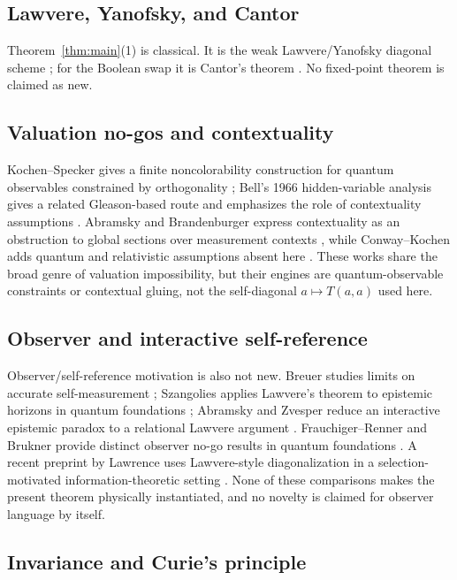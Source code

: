 \documentclass[11pt]{article}
\theoremstyle{definition}
\theoremstyle{remark}
\begin{document}
\subsection{Lawvere, Yanofsky, and Cantor}

Theorem~\ref{thm:main}(1) is classical. It is the weak Lawvere/Yanofsky diagonal scheme \cite{lawvere1969,yanofsky2003}; for the Boolean swap it is Cantor's theorem \cite{cantor1891}. No fixed-point theorem is claimed as new.

\subsection{Valuation no-gos and contextuality}

Kochen--Specker gives a finite noncolorability construction for quantum observables constrained by orthogonality \cite{kochenspecker1967}; Bell's 1966 hidden-variable analysis gives a related Gleason-based route and emphasizes the role of contextuality assumptions \cite{bell1966}. Abramsky and Brandenburger express contextuality as an obstruction to global sections over measurement contexts \cite{abramskybrandenburger2011}, while Conway--Kochen adds quantum and relativistic assumptions absent here \cite{conwaykochen2006}. These works share the broad genre of valuation impossibility, but their engines are quantum-observable constraints or contextual gluing, not the self-diagonal $a\mapsto T(a,a)$ used here.

\subsection{Observer and interactive self-reference}

Observer/self-reference motivation is also not new. Breuer studies limits on accurate self-measurement \cite{breuer1995}; Szangolies applies Lawvere's theorem to epistemic horizons in quantum foundations \cite{szangolies2018}; Abramsky and Zvesper reduce an interactive epistemic paradox to a relational Lawvere argument \cite{abramskyzvesper2015}. Frauchiger--Renner and Brukner provide distinct observer no-go results in quantum foundations \cite{frauchigerrenner2018,brukner2018}. A recent preprint by Lawrence uses Lawvere-style diagonalization in a selection-motivated information-theoretic setting \cite{lawrence2026}. None of these comparisons makes the present theorem physically instantiated, and no novelty is claimed for observer language by itself.

\subsection{Invariance and Curie's principle}
\end{document}
